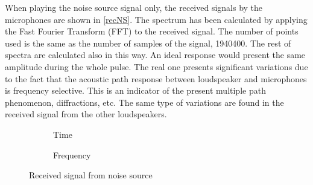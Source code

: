 When playing the noise source signal only, the received signals by the microphones are shown in \autoref{recNS}. The spectrum has been calculated by applying the Fast Fourier Transform (FFT) to the received signal. The number of points used is the same as the number of samples of the signal, 1940400. The rest of spectra are calculated also in this way. An ideal response would present the same amplitude during the whole pulse. The real one presents significant variations due to the fact that the acoustic path response between loudspeaker and microphones is frequency selective. This is an indicator of the present multiple path phenomenon, diffractions, etc. The same type of variations are found in the received signal from the other loudspeakers. %

\begin{figure}
	\begin{subfigure}[b]{0.49\textwidth}
		\centering
		\def\svgwidth{0.9\columnwidth}
		\graphicspath{{Img/}}
		{\fontsize{5}{12}\selectfont
			
		}
		\caption{Time}
	\end{subfigure}
	\begin{subfigure}[b]{0.49\textwidth}
		\centering
		\def\svgwidth{0.9\columnwidth}
		\graphicspath{{Img/}}
		{\fontsize{5}{12}\selectfont
			
		}
		\caption{Frequency}
	\end{subfigure}
	\caption{Received signal from noise source}
	\label{recNS}
\end{figure}

